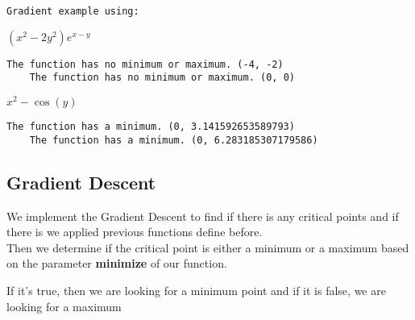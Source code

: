 \documentclass[../convex_optimization.tex]{subfiles}
\begin{document}
\begin{Verbatim}[commandchars=\\\{\}]
    Gradient example using:
\end{Verbatim}

$\displaystyle \left(x^{2} - 2 y^{2}\right) e^{x - y}$


\begin{Verbatim}[commandchars=\\\{\}]
    The function has no minimum or maximum. (-4, -2)
    The function has no minimum or maximum. (0, 0)

\end{Verbatim}

$\displaystyle x^{2} - \cos{\left(y \right)}$


\begin{Verbatim}[commandchars=\\\{\}]
    The function has a minimum. (0, 3.141592653589793)
    The function has a minimum. (0, 6.283185307179586)
\end{Verbatim}

\hypertarget{gradient-descent}{%
\subsection{Gradient Descent}\label{gradient-descent}}

We implement the Gradient Descent to find if there is any critical
points and if there is we applied previous functions define before.\\
Then we determine if the critical point is either a minimum or a maximum
based on the parameter \textbf{minimize} of our function.

If it's true, then we are looking for a minimum point and if it is
false, we are looking for a maximum
\end{document}

